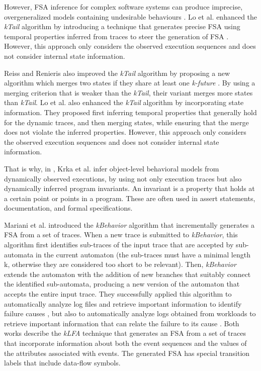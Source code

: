 However, FSA inference for complex software systems can produce
imprecise, overgeneralized models containing undesirable
behaviours \cite{4023976}. Lo et al. enhanced the \textit{kTail}
algorithm by introducing a technique that generates precise FSA
using temporal properties inferred from traces to steer the
generation of FSA \cite{Lo:2009:ASB:1595696.1595761}. However,
this approach only considers the observed execution sequences and
does not consider internal state information.

Reiss and Renieris also improved the \textit{kTail} algorithm by
proposing a new algorithm which merges two states if they share
at least one \textit{k-future} \cite{919096}. By using a merging
criterion that is weaker than the \textit{kTail}, their variant
merges more states than \textit{kTail}.
Lo et al. \cite{Lo:2009:ASB:1595696.1595761} also enhanced the
\textit{kTail} algorithm by incorporating state information. They
proposed first inferring temporal properties that generally hold
for the dynamic traces, and then merging states, while ensuring
that the merge does not violate the inferred properties. However,
this approach only considers the observed execution sequences and
does not consider internal state information.

That is why, in \cite{Krka:2010:UDE:1810295.1810324}, Krka et al.
infer object-level behavioral models from dynamically observed
executions, by using not only execution traces but also
dynamically inferred program invariants. An invariant is a
property that holds at a certain point or points in a program.
These are often used in assert statements, documentation, and
formal specifications.

Mariani et al. introduced the \textit{kBehavior} algorithm
\cite{mariani2007dynamic} that incrementally generates a FSA from
a set of traces. When a new trace is submitted to
\textit{kBehavior}, this algorithm first identifies sub-traces of
the input trace that are accepted by sub-automata in the current
automaton (the sub-traces must have a minimal length k, otherwise
they are considered too short to be relevant). Then,
\textit{kBehavior} extends the automaton with the addition of new
branches that suitably connect the identified sub-automata,
producing a new version of the automaton that accepts the entire
input trace. They successfully applied this algorithm to
automatically analyze log files and retrieve important
information to identify failure causes \cite{4700316}, but also
to automatically analyze logs obtained from workloads to retrieve
important information that can relate the failure to its cause
\cite{cotroneo2007investigation}.
Both works describe the \textit{kLFA} technique that generates an
FSA from a set of traces that incorporate information about both
the event sequences and the values of the attributes associated
with events. The generated FSA has special transition labels that
include data-flow symbols.

